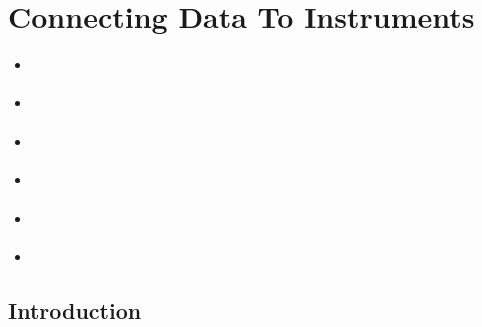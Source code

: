 \documentclass[letterpaper,10pt,english,openany]{sphinxmanual}
\begin{document}
\section{Connecting Data To Instruments}
\label{\detokenize{mantid_basic_course/connecting_data_to_instruments/index:connecting-data-to-instruments}}\label{\detokenize{mantid_basic_course/connecting_data_to_instruments/index:id1}}\label{\detokenize{mantid_basic_course/connecting_data_to_instruments/index::doc}}
\begin{itemize}
\item {} 
{\hyperref[\detokenize{mantid_basic_course/connecting_data_to_instruments/01_introduction:introduction-conn}]{}}

\item {} 
{\hyperref[\detokenize{mantid_basic_course/connecting_data_to_instruments/02_displaying_and_navigating:displaying-and-navigating}]{}}

\item {} 
{\hyperref[\detokenize{mantid_basic_course/connecting_data_to_instruments/03_investigating_data:investigating-data}]{}}

\item {} 
{\hyperref[\detokenize{mantid_basic_course/connecting_data_to_instruments/04_masking_and_grouping:masking-and-grouping}]{}}

\item {} 
{\hyperref[\detokenize{mantid_basic_course/connecting_data_to_instruments/05_instrument_tree:instrument-tree}]{}}

\item {} 
{\hyperref[\detokenize{mantid_basic_course/connecting_data_to_instruments/06_exercises_c:exercises-c}]{}}

\end{itemize}


\subsection{Introduction}
\label{\detokenize{mantid_basic_course/connecting_data_to_instruments/01_introduction:introduction}}\label{\detokenize{mantid_basic_course/connecting_data_to_instruments/01_introduction:introduction-conn}}\label{\detokenize{mantid_basic_course/connecting_data_to_instruments/01_introduction::doc}}
\end{document}
